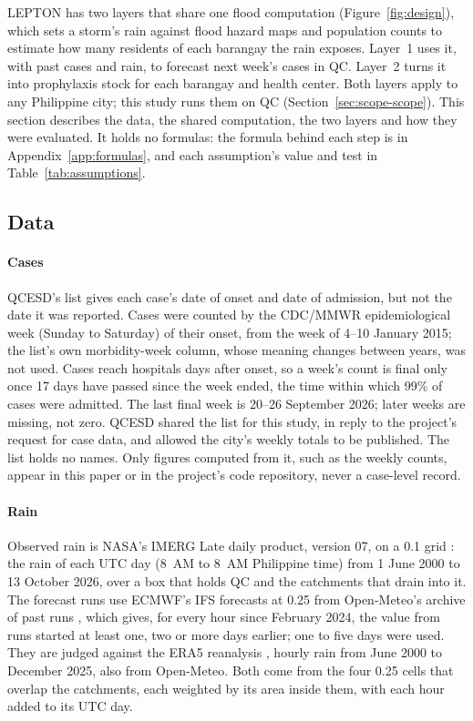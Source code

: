 LEPTON has two layers that share one flood computation (Figure~\ref{fig:design}), which sets a
storm's rain against flood hazard maps and population counts to estimate how many residents of
each barangay the rain exposes. Layer~1 uses it, with past cases and rain, to forecast next week's cases in QC. Layer~2
turns it into prophylaxis stock for each barangay and health center. Both layers apply to any
Philippine city; this study runs them on QC (Section~\ref{sec:scope-scope}). This section describes the
data, the shared computation, the two layers and how they were evaluated. It holds no formulas:
the formula behind each step is in Appendix~\ref{app:formulas}, and each assumption's value and
test in Table~\ref{tab:assumptions}.

\subsection{Data}\label{sec:data}

\paragraph{Cases}
QCESD's list gives each case's date of onset and date of admission, but not the date it was
reported. Cases were counted by the CDC/MMWR epidemiological week (Sunday to Saturday) of their
onset, from the week of 4--10 January 2015; the list's own morbidity-week column, whose meaning
changes between years, was not used. Cases reach hospitals days after onset, so a week's count is
final only once 17 days have passed since the week ended, the time within which 99\% of cases
were admitted. The last final week is 20--26 September 2026; later weeks are missing, not zero.
QCESD shared the list for this study, in reply to the project's request for case data, and
allowed the city's weekly totals to be published. The list holds no names. Only figures computed
from it, such as the weekly counts, appear in this paper or in the project's code repository,
never a case-level record.

\paragraph{Rain}
Observed rain is NASA's IMERG Late daily product, version 07, on a 0.1\textdegree{} grid
\parencite{huffman2024}: the rain of each UTC day (8~AM to 8~AM Philippine time) from 1 June 2000
to 13 October 2026, over a box that holds QC and the catchments that drain into it. The
forecast runs use ECMWF's IFS forecasts at 0.25\textdegree{} from Open-Meteo's archive of past
runs \parencite{zippenfenig2023}, which gives, for every hour since February 2024, the value from
runs started at least one, two or more days earlier; one to five days were used. They are judged
against the ERA5
reanalysis \parencite{hersbach2020}, hourly rain from June 2000 to December 2025, also from
Open-Meteo. Both come from the four 0.25\textdegree{} cells that overlap the catchments, each
weighted by its area inside them, with each hour added to its UTC day.

